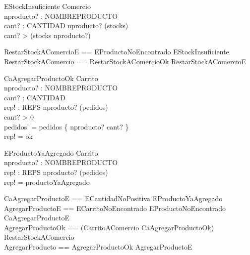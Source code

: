 \documentclass[11pt]{article}
\begin{document}
\begin{schema}{EStockInsuficiente}
\Xi Comercio \\
nproducto? : NOMBREPRODUCTO \\
cant? : CANTIDAD
\where
nproducto? \in (\dom stocks) \\
cant? > (stocks \; nproducto?) \\
\end{schema}

\begin{zed}
RestarStockAComercioE == EProductoNoEncontrado \lor EStockInsuficiente \\
RestarStockAComercio == RestarStockAComercioOk \lor RestarStockAComercioE
\end{zed}


\begin{schema}{CaAgregarProductoOk}
\Delta Carrito \\
nproducto? : NOMBREPRODUCTO \\
cant? : CANTIDAD \\
rep! : REPS
\where
nproducto? \notin (\dom pedidos) \\
cant? > 0 \\
pedidos' = pedidos \cup \{ nproducto? \mapsto cant? \} \\
rep! = ok
\end{schema}

\begin{schema}{EProductoYaAgregado}
\Xi Carrito \\
nproducto? : NOMBREPRODUCTO \\
rep! : REPS
\where
nproducto? \in (\dom pedidos) \\
rep! = productoYaAgregado
\end{schema}

\begin{zed}
CaAgregarProductoE == ECantidadNoPositiva \lor EProductoYaAgregado \\
AgregarProductoE == ECarritoNoEncontrado \lor EProductoNoEncontrado \lor CaAgregarProductoE \\
AgregarProductoOk == (CarritoAComercio \land CaAgregarProductoOk) \semi RestarStockAComercio\\
AgregarProducto == AgregarProductoOk \lor AgregarProductoE
\end{zed}
\end{document}
